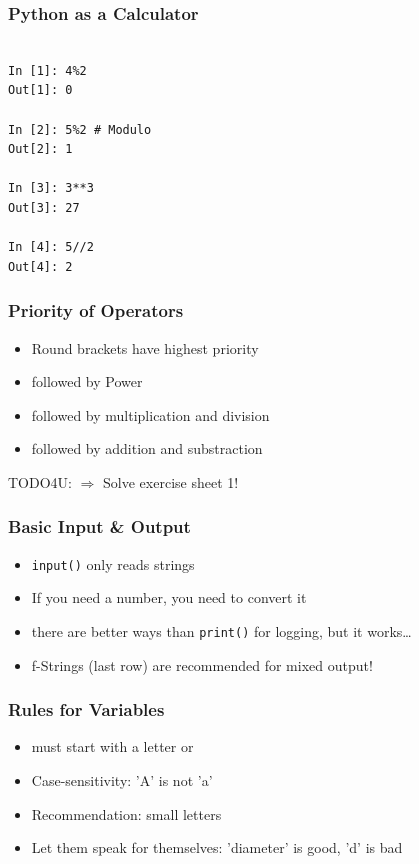 \documentclass[ngerman]{beamer}
\begin{document}
\begin{frame}[fragile]
\frametitle{Python as a Calculator}

\begin{lstlisting}[style=Python]

In [1]: 4%2
Out[1]: 0

In [2]: 5%2 # Modulo
Out[2]: 1

In [3]: 3**3
Out[3]: 27

In [4]: 5//2
Out[4]: 2
\end{lstlisting}

\end{frame}

\begin{frame}
\frametitle{Priority of Operators}

\begin{itemize}
\item Round brackets have highest priority
\item followed by Power
\item followed by multiplication and division
\item followed by addition and substraction
\end{itemize}

\begin{block}{TODO4U:}
$\Rightarrow$ Solve exercise sheet 1!
\end{block}

\end{frame}

\begin{frame}[fragile]
\frametitle{Basic Input \& Output}



\begin{itemize}
	\item \lstinline[style=Python]{input()} only reads strings	
	\item If you need a number, you need to convert it
	\item there are better ways than \lstinline[style=Python]{print()} for logging, but it works\ldots 
	\item f-Strings (last row) are recommended for mixed output!
	\end{itemize}
\end{frame}

\begin{frame}
\frametitle{Rules for Variables}

\begin{itemize}
\item must start with a letter or \textunderscore
\item Case-sensitivity: 'A' is not 'a'
\item Recommendation: small letters
\item Let them speak for themselves: 'diameter' is good, 'd' is bad 
\end{itemize}
\end{frame}
\end{document}

